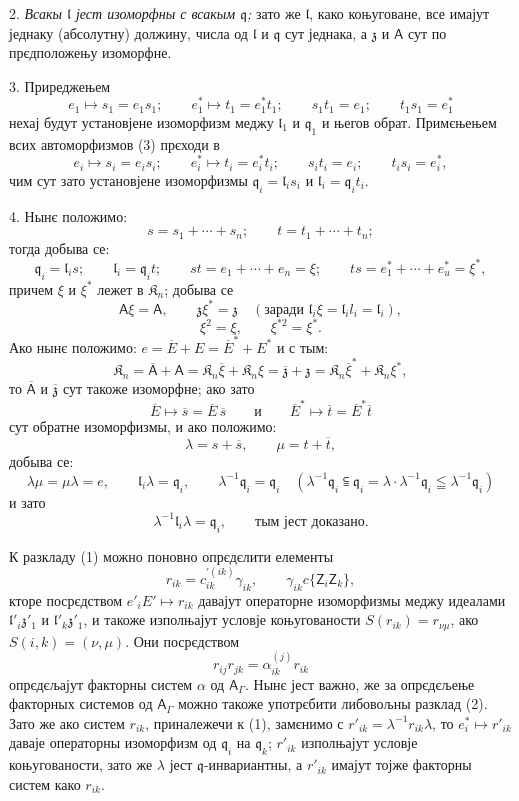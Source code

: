 \documentclass[11pt]{article}
\begin{document}
2. \emph{Всакы \(\mathfrak l\) јест изоморфны с всакым \(\mathfrak q\);} зато же \(\mathfrak l\), како коњуговане, все имајут једнаку (абсолутну) должину, числа од \(\mathfrak l\) и \(\mathfrak q\) сут једнака, а \(\mathfrak z\) и \(\mathsf{A}\) сут по прєдположењу изоморфне.

3. Приреджењем
\[
\tag{3}
e_1\mapsto s_1=e_1s_1;\qquad
e_1^*\mapsto t_1=e_1^*t_1;\qquad
s_1t_1=e_1;\qquad
t_1s_1=e_1^*
\]
нехај будут установјене изоморфизм меджу \(\mathfrak l_1\) и \(\mathfrak q_1\) и његов обрат. Примєњењем всих автоморфизмов (3) прєходи в
\[
e_i\mapsto s_i=e_is_i;\qquad
e_i^*\mapsto t_i=e_i^*t_i;\qquad
s_it_i=e_i;\qquad
t_is_i=e_i^*,
\]
чим сут зато установјене изоморфизмы \(\mathfrak q_i=\mathfrak l_is_i\) и \(\mathfrak l_i=\mathfrak q_it_i\).

4. Нынє положимо:
\[
s=s_1+\cdots+s_n;\qquad t=t_1+\cdots+t_n;
\]
тогда добыва се:
\[
\mathfrak q_i=\mathfrak l_is;\qquad
\mathfrak l_i=\mathfrak q_it;\qquad
st=e_1+\cdots+e_n=\xi;\qquad
ts=e_1^*+\cdots+e_u^*=\xi^*,
\]
причем \(\xi\) и \(\xi^*\) лежет в \(\mathfrak K_n\); добыва се
\[
\mathsf{A}\xi=\mathsf{A},\qquad \mathfrak z\xi^*=\mathfrak z\quad
(\text{заради }\mathfrak l_i\xi=\mathfrak l_il_i=\mathfrak l_i),
\]
\[
\xi^2=\xi,\qquad \xi^{*2}=\xi^*.
\]
Ако нынє положимо: \(e=\overline E+E=\overline E^*+E^*\) и с тым:
\[
\mathfrak K_n=\overline{\mathsf A}+\mathsf{A}
=\mathfrak K_n\overline\xi+\mathfrak K_n\xi
=\overline{\mathfrak z}+\mathfrak z
=\mathfrak K_n\overline\xi^*+\mathfrak K_n\xi^*,
\]
то \(\overline{\mathsf A}\) и \(\overline{\mathfrak z}\) сут такоже изоморфне; ако зато
\[
\overline E\mapsto\overline s=\overline E\,\overline s
\qquad\text{и}\qquad
\overline E^*\mapsto\overline t=\overline E^*\overline t
\]
сут обратне изоморфизмы, и ако положимо:
\[
\lambda=s+\overline s,\qquad \mu=t+\overline t,
\]
добыва се:
\[
\lambda\mu=\mu\lambda=e,\qquad
\mathfrak l_i\lambda=\mathfrak q_i,\qquad
\lambda^{-1}\mathfrak q_i=\mathfrak q_i
\quad
(\lambda^{-1}\mathfrak q_i\subseteqq\mathfrak q_i
=\lambda\cdot\lambda^{-1}\mathfrak q_i\leqq\lambda^{-1}\mathfrak q_i)
\]
и зато
\[
\lambda^{-1}\mathfrak l_i\lambda=\mathfrak q_i,\qquad \text{тым јест доказано.}
\]

К разкладу (1) можно поновно опрєдєлити елементы
\[
r_{ik}=c_{ik}^{\prime(ik)}\gamma_{ik},\qquad \gamma_{ik}c\{\mathsf{Z}_i\mathsf{Z}_k\},
\]
кторе посрєдством \(e'_iE'\mapsto r_{ik}\) давајут операторне изоморфизмы меджу идеалами \(\mathfrak l'_i\mathfrak z'_1\) и \(\mathfrak l'_k\mathfrak z'_1\), и такоже изполњајут условје коњугованости \(S(r_{ik})=r_{\nu\mu}\), ако \(S(i,k)=(\nu,\mu)\). Они посрєдством
\[
r_{ij}r_{jk}=\alpha_{ik}^{(j)}r_{ik}
\]
опрєдєљајут факторны систем \(\alpha\) од \(\mathsf{A}_\Gamma\). Нынє јест важно, же за опрєдєљење факторных системов од \(\mathsf{A}_\Gamma\) можно такоже употрєбити либовољны разклад (2). Зато же ако систем \(r_{ik}\), приналежечи к (1), замєнимо с \(r'_{ik}=\lambda^{-1}r_{ik}\lambda\), то \(e_i^*\mapsto r'_{ik}\) даваје операторны изоморфизм од \(\mathfrak q_i\) на \(\mathfrak q_k\); \(r'_{ik}\) изполњајут условје коњугованости, зато же \(\lambda\) јест \(\mathfrak q\)-инвариантны, а \(r'_{ik}\) имајут тојже факторны систем како \(r_{ik}\).
\end{document}
